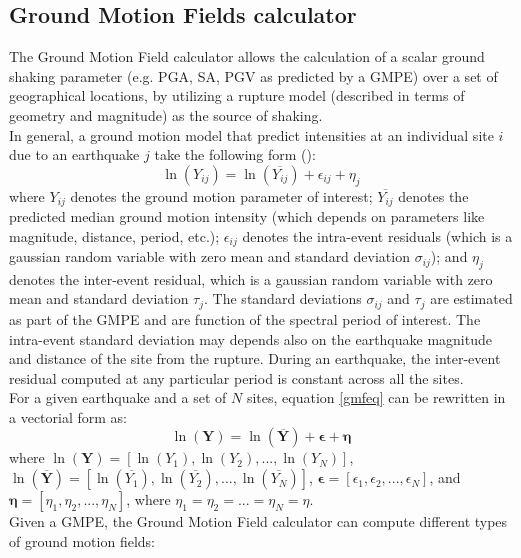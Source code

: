 %
\subsection{Ground Motion Fields calculator}
The Ground Motion Field calculator allows the calculation of a scalar ground shaking parameter (e.g. PGA, SA, PGV as predicted by a GMPE) over a set of geographical locations, by utilizing a rupture model (described in terms of geometry and magnitude) as the source of shaking.\\
In general, a ground motion model that predict intensities at an individual site $i$ due to an earthquake $j$ take the following form (\cite{jayaram2009}):
\begin{equation}
\ln (Y_{ij}) = \ln (\overline{Y_{ij}})+\epsilon_{ij}+\eta_{j}
\label{gmfeq}
\end{equation}
where $Y_{ij}$ denotes the ground motion parameter of interest; $\overline{Y_{ij}}$ denotes the predicted median ground motion intensity (which depends on parameters like magnitude, distance, period, etc.); $\epsilon_{ij}$ denotes the intra-event residuals (which is a gaussian random variable with zero mean and standard deviation $\sigma_{ij}$); and $\eta_{j}$ denotes the inter-event residual, which is a gaussian random variable with zero mean and standard deviation $\tau_{j}$. The standard deviations $\sigma_{ij}$ and $\tau_{j}$ are estimated as part of the GMPE and are function of the spectral period of interest. The intra-event standard deviation may depends also on the earthquake magnitude and distance of the site from the rupture. During an earthquake, the inter-event residual computed at any particular period is constant across all the sites.\\
For a given earthquake and a set of $N$ sites, equation \ref{gmfeq} can be rewritten in a vectorial form as:
\begin{equation}
\ln (\bm{Y}) = \ln (\overline{\bm{Y}})+\bm{\epsilon}+\bm{\eta} 
\label{gmfeqvec}
\end{equation}
where ${\ln (\bm{Y})}=[\ln (Y_{1}), \ln (Y_{2}),...,\ln (Y_{N})]$, $\ln (\overline{\bm{Y}})=[\ln (\overline{Y_{1}}), \ln (\overline{Y_{2}}),...,\ln (\overline{Y_{N}})]$, $\bm{\epsilon}=[\epsilon_{1},\epsilon_{2},...,\epsilon_{N}]$, and $\bm{\eta}=[\eta_{1},\eta_{2},...,\eta_{N}]$, where $\eta_{1}=\eta_{2}=...=\eta_{N}=\eta$.\\
Given a GMPE, the Ground Motion Field calculator can compute different types of ground motion fields:
